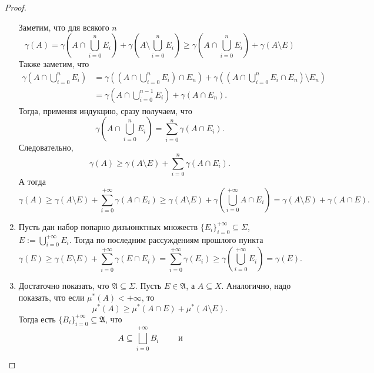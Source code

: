 \documentclass[12pt,a4paper]{article}
\begin{document}
\begin{proof}
\begin{enumerate}
                Заметим, что для всякого $n$
                \[
                    \gamma(A)
                    = \gamma\left(A \cap \bigcup_{i=0}^{n} E_i\right) + \gamma\left(A \setminus \bigcup_{i=0}^{n} E_i\right)
                    \geqslant \gamma\left(A \cap \bigcup_{i=0}^{n} E_i\right) + \gamma\left(A \setminus E\right)
                \]
                Также заметим, что
                \begin{align*}
                    \gamma\left(A \cap \bigcup_{i=0}^{n} E_i\right)
                    &= \gamma\left(\left(A \cap \bigcup_{i=0}^{n} E_i\right) \cap E_n\right) + \gamma\left(\left(A \cap \bigcup_{i=0}^{n} E_i \cap E_n\right) \setminus E_n\right)\\
                    &= \gamma\left(A \cap \bigcup_{i=0}^{n-1} E_i\right) + \gamma\left(A \cap E_n\right).
                \end{align*}
                Тогда, применяя индукцию, сразу получаем, что
                \[\gamma\left(A \cap \bigcup_{i=0}^{n} E_i\right) = \sum_{i=0}^n \gamma(A \cap E_i).\]
                Следовательно,
                \[\gamma(A) \geqslant \gamma(A \setminus E) + \sum_{i=0}^n \gamma(A \cap E_i).\]
                А тогда
                \[
                    \gamma(A)
                    \geqslant \gamma(A \setminus E) + \sum_{i=0}^{+\infty} \gamma(A \cap E_i)
                    \geqslant \gamma(A \setminus E) + \gamma\left(\bigcup_{i=0}^{+\infty} A \cap E_i\right)
                    = \gamma(A \setminus E) + \gamma(A \cap E).
                \]
            \item Пусть дан набор попарно дизъюнктных множеств $\{E_i\}_{i=0}^{+\infty} \subseteq \Sigma$, $E := \bigcup_{i=0}^{+\infty} E_i$. Тогда по последним рассуждениям прошлого пункта
                \[
                    \gamma(E)
                    \geqslant \gamma(E \setminus E) + \sum_{i=0}^{+\infty} \gamma(E \cap E_i)
                    = \sum_{i=0}^{+\infty} \gamma(E_i)
                    \geqslant \gamma\left(\bigcup_{i=0}^{+\infty} E_i\right)
                    = \gamma(E).
                \]
            \item Достаточно показать, что $\mathfrak{A} \subseteq \Sigma$. Пусть $E \in \mathfrak{A}$, а $A \subseteq X$. Аналогично, надо показать, что если $\mu^*(A) < +\infty$, то
                \[\mu^*(A) \geqslant \mu^*(A \cap E) + \mu^*(A \setminus E).\]
                Тогда есть $\{B_i\}_{i=0}^{+\infty} \subseteq \mathfrak{A}$, что
                \[
                    A \subseteq \bigsqcup_{i=0}^{+\infty} B_i
                    \qquad \text{ и } \qquad
\]
\end{enumerate}
\end{proof}
\end{document}

